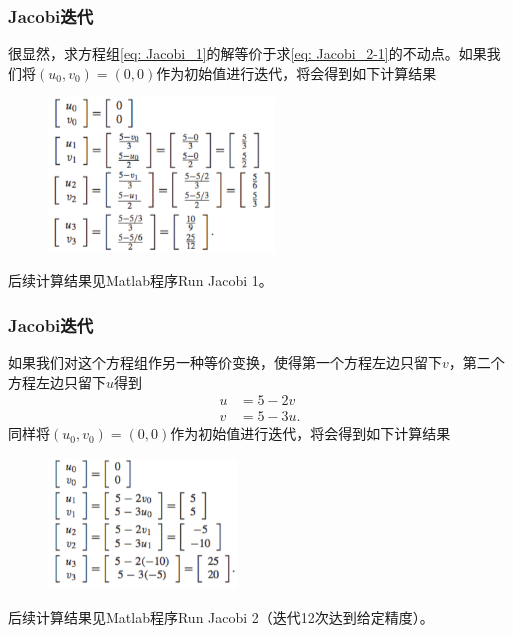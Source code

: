 \documentclass[10pt]{beamer}
\begin{document}
\begin{frame}
\frametitle{Jacobi迭代}
很显然，求方程组\eqref{eq: Jacobi_1}的解等价于求\eqref{eq: Jacobi_2-1}的不动点。如果我们将$(u_0,v_0) = (0,0)$作为初始值进行迭代，将会得到如下计算结果
\begin{figure}
\includegraphics[width=6cm]{figs/2_5_Jacobi-1} 
\end{figure}
后续计算结果见Matlab程序Run Jacobi 1。
\end{frame}


\begin{frame}
\frametitle{Jacobi迭代}
如果我们对这个方程组作另一种等价变换，使得第一个方程左边只留下$v$，第二个方程左边只留下$u$得到
\begin{align}
\label{eq: Jacobi_2-2}
u &=5 - 2v \nonumber \\
v &=5 - 3u.
\end{align}
同样将$(u_0,v_0) = (0,0)$作为初始值进行迭代，将会得到如下计算结果
\begin{figure}
\includegraphics[width=5cm]{figs/2_5_Jacobi-2} 
\end{figure}
后续计算结果见Matlab程序Run Jacobi 2（迭代12次达到给定精度）。
\end{frame}
\end{document}
